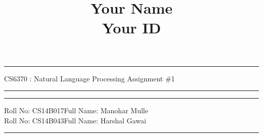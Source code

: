 \documentclass[11pt]{exam}
\title{Your Name\\ Your ID}
\author{}
\date{}
\begin{document}
\hrule
\vspace{3mm}
\noindent
{\sf CS6370 : Natural Language Processing  \hfill Assignment \#1 }
\vspace{3mm}
\noindent
\hrule


\hrule
\vspace{3mm}
\noindent
{\sf Roll No: CS14B017\hfill Full Name: Manohar Mulle} 
\vspace{3mm}\\
\noindent
{\sf Roll No: CS14B043\hfill Full Name: Harshal Gawai} 
\vspace{3mm}
\hrule
\end{document}
